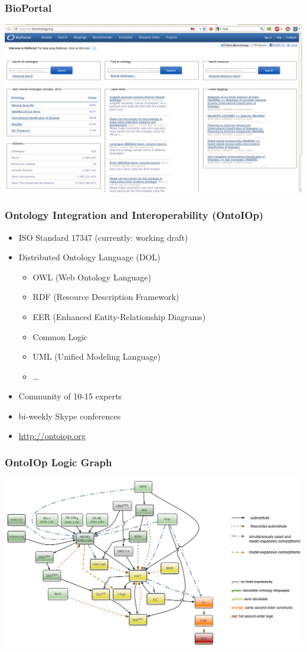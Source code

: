 \documentclass[german]{beamer}
\begin{document}
\begin{frame}
\frametitle{BioPortal}
\vspace{-1cm}
\includegraphics[width=1\textwidth]{Screenshot_Bioportal.png}
\end{frame}

\begin{frame}
\frametitle{Ontology Integration and Interoperability (OntoIOp)}
\begin{itemize}
\item ISO Standard 17347 (currently: working draft)
\item Distributed Ontology Language (DOL)
\begin{itemize}
\item OWL (Web Ontology Language)
\item RDF (Resource Description Framework)
\item EER (Enhanced Entity-Relationship Diagrams)
\item Common Logic
\item UML (Unified Modeling Language)
\item \ldots
\end{itemize}
\item Community of 10-15 experts
\item bi-weekly Skype conferences
\item \url{http://ontoiop.org}
\end{itemize}
\end{frame}

\begin{frame}
\frametitle{OntoIOp Logic Graph}
\includegraphics[width=\textwidth]{ontograph}
\end{frame}
\end{document}
